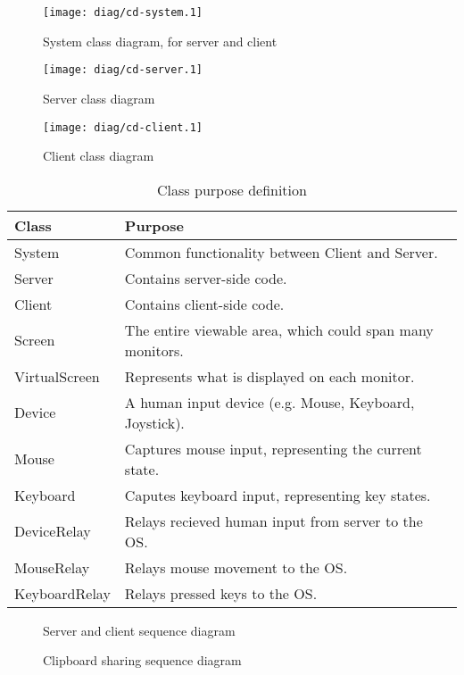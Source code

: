 \begin{figure}[ht!]
  \begin{center}
    \texttt{[image: diag/cd-system.1]}
    \caption{System class diagram, for server and client}
    \label{fig:systemClassDiagram}
  \end{center}
\end{figure}

\begin{figure}[ht!]
  \begin{center}
    \texttt{[image: diag/cd-server.1]}
    \caption{Server class diagram}
    \label{fig:serverClassDiagram}
  \end{center}
\end{figure}

\begin{figure}[ht!]
  \begin{center}
    \texttt{[image: diag/cd-client.1]}
    \caption{Client class diagram}
    \label{fig:clientClassDiagram}
  \end{center}
\end{figure}

\begin{table}[ht!]
  \begin{tabular}{|l|l|}
    \hline
    \textbf{Class} & \textbf{Purpose} \\
    \hline
    System & Common functionality between Client and Server. \\
    Server & Contains server-side code. \\
    Client & Contains client-side code. \\
    Screen & The entire viewable area, which could span many monitors. \\
    VirtualScreen & Represents what is displayed on each monitor. \\
    Device & A human input device (e.g. Mouse, Keyboard, Joystick). \\
    Mouse & Captures mouse input, representing the current state. \\
    Keyboard & Caputes keyboard input, representing key states. \\
    DeviceRelay & Relays recieved human input from server to the OS. \\
    MouseRelay & Relays mouse movement to the OS. \\
    KeyboardRelay & Relays pressed keys to the OS. \\
    \hline
  \end{tabular}
  \caption{Class purpose definition}
  \label{tab:classes}
\end{table}

\begin{figure}
  \centering
  
  \caption{Server and client sequence diagram}
\end{figure}

\begin{figure}
  \centering
  
  \caption{Clipboard sharing sequence diagram}
\end{figure}
